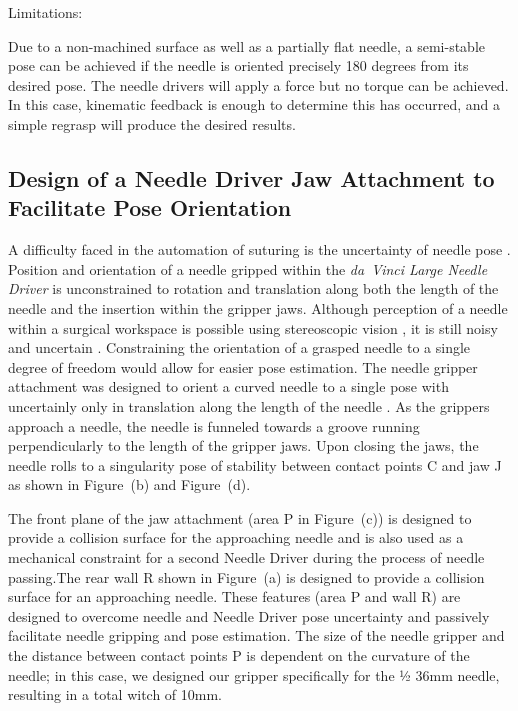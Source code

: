 Limitations: 

Due to a non-machined surface as well as a partially flat needle, a semi-stable pose can be achieved if the needle is oriented precisely 180 degrees from its desired pose. The needle drivers will apply a force but no torque can be achieved. In this case, kinematic feedback is enough to determine this has occurred, and a simple regrasp will produce the desired results. 

\subsection{Design of a Needle Driver Jaw Attachment to Facilitate Pose Orientation}

A difficulty faced in the automation of suturing is the uncertainty of needle pose \tocite. Position and orientation of a needle gripped within the \textit{da~Vinci Large Needle Driver} is unconstrained to rotation and translation along both the length of the needle and the insertion within the gripper jaws. Although perception of a needle within a surgical workspace is possible using stereoscopic vision \tocite, it is still noisy and uncertain \tocite. Constraining the orientation of a grasped needle to a single degree of freedom would allow for easier pose estimation. The needle gripper attachment was designed to orient a curved needle to a single pose with uncertainly only in translation along the length of the needle . As the grippers approach a needle, the needle is funneled towards a groove running perpendicularly to the length of the gripper jaws. Upon closing the jaws, the needle rolls to a singularity pose of stability between contact points C  and jaw J as shown in Figure~(b) and Figure~(d).

The front plane of the jaw attachment (area P  in Figure~(c)) is designed to provide a collision surface for the approaching needle and is also used as a mechanical constraint for a second Needle Driver during the process of needle passing.The rear wall R shown in Figure~(a)  is designed to provide a collision surface for an approaching needle. These features (area P and wall R) are designed to overcome needle and Needle Driver pose uncertainty and passively facilitate needle gripping and pose estimation. The size of the needle gripper and the distance between contact points P is dependent on the curvature of the needle; in this case, we designed our gripper specifically for the ½ 36mm needle, resulting in a total witch of 10mm.

